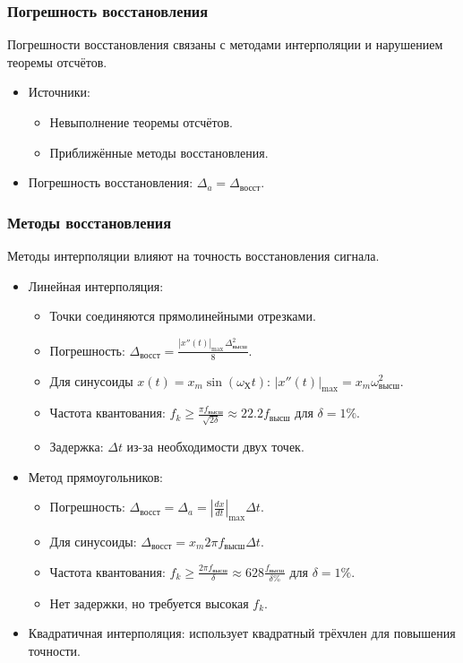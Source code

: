 	\subsubsection{Погрешность восстановления}
	Погрешности восстановления связаны с методами интерполяции и нарушением теоремы отсчётов.
	\begin{itemize}
		\item Источники:
		\begin{itemize}
			\item Невыполнение теоремы отсчётов.
			\item Приближённые методы восстановления.
		\end{itemize}
		\item Погрешность восстановления: $\Delta_a = \Delta_{\text{восст}}$.
	\end{itemize}
	
	\subsubsection{Методы восстановления}
	Методы интерполяции влияют на точность восстановления сигнала.
	\begin{itemize}
		\item Линейная интерполяция:
		\begin{itemize}
			\item Точки соединяются прямолинейными отрезками.
			\item Погрешность: $\Delta_{\text{восст}} = \frac{|x''(t)|_{\text{max}} \, \Delta_{\text{высш}}^2}{8}$.
			\item Для синусоиды $x(t) = x_m \sin(\omega_Х t)$: $|x''(t)|_{\text{max}} = x_m \omega_{\text{высш}}^2$.
			\item Частота квантования: $f_k \geq \frac{\pi f_{\text{высш}}}{\sqrt{2\delta}} \approx 22.2 f_{\text{высш}}$ для $\delta = 1\%$.
			\item Задержка: $\Delta t$ из-за необходимости двух точек.
		\end{itemize}
		\item Метод прямоугольников:
		\begin{itemize}
			\item Погрешность: $\Delta_{\text{восст}} = \Delta_a = \left| \frac{dx}{dt} \right|_{\text{max}} \Delta t$.
			\item Для синусоиды: $\Delta_{\text{восст}} = x_m 2\pi f_{\text{высш}} \Delta t$.
			\item Частота квантования: $f_k \geq \frac{2\pi f_{\text{высш}}}{\delta} \approx 628 \frac{f_{\text{высш}}} {\delta \%}$ для $\delta = 1\%$.
			\item Нет задержки, но требуется высокая $f_k$.
		\end{itemize}
		\item Квадратичная интерполяция: использует квадратный трёхчлен для повышения точности.
	\end{itemize}
	

